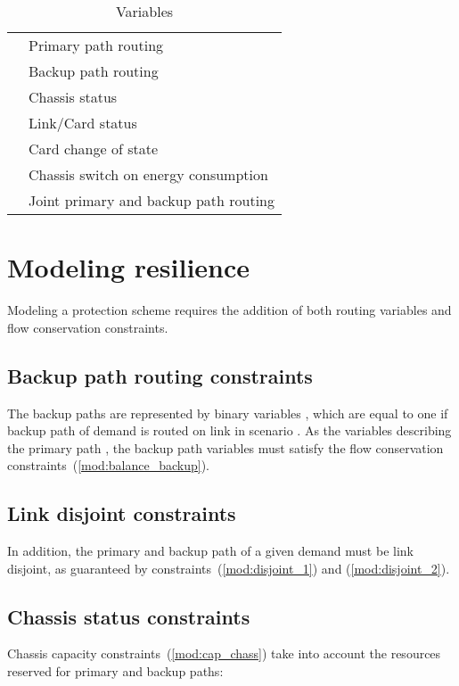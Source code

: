 \documentclass[final,5p,times,twocolumn]{elsarticle}
\begin{document}
\begin{table}[htc]
\begin{tabular}{c|l}
\hline
 & Primary path routing\\
 & Backup path routing\\
 & Chassis status\\ & Link/Card status\\ & Card change of state\\ & Chassis switch on energy consumption\\ & Joint primary and backup path routing\\
\hline
\end{tabular}
\caption{Variables} \label{tab::variables}
\end{table}



\section{Modeling resilience}\label{sec:resilience}


Modeling a protection scheme requires the addition of both routing variables and flow conservation constraints. 

\subsection{Backup path routing constraints}
The backup paths are represented by binary variables , which are equal to one if backup path of demand  is routed on link  in scenario . As the variables describing the primary path , the backup path variables must satisfy the flow conservation constraints~(\ref{mod:balance_backup}).




\subsection{Link disjoint constraints}

In addition, the primary and backup path of a given demand  must be link disjoint, as guaranteed by constraints~(\ref{mod:disjoint_1}) and (\ref{mod:disjoint_2}).



\subsection{Chassis status constraints}
Chassis capacity constraints~(\ref{mod:cap_chass}) take into account the resources reserved for primary and backup paths:
\end{document}
